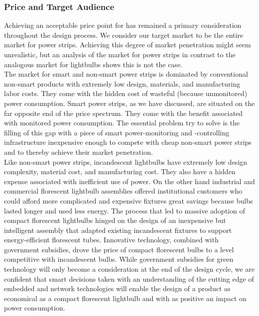 \subsubsection{Price and Target Audience}
Achieving an acceptable price point for \netlets has remained a primary consideration throughout the design process. We consider our target market to be the entire market for power strips. Achieving this degree of market penetration might seem unrealistic, but an analysis of the market for power strips in contrast to the analogous market for lightbulbs shows this is not the case.\\ 

The market for smart and non-smart power strips is dominated by conventional non-smart products with extremely low design, materials, and manufacturing labor costs. They come with the hidden cost of wasteful (because unmonitored) power consumption. Smart power strips, as we have discussed, are situated on the far opposite end of the price spectrum. They come with the benefit associated with monitored power consumption. The essential problem \netlets try to solve is the filling of this gap with a piece of smart power-monitoring and -controlling infrastructure inexpensive enough to compete with cheap non-smart power strips and to thereby achieve their market penetration.\\ 

Like non-smart power strips, incandescent lightbulbs have extremely low design complexity, material cost, and manufacturing cost. They also have a hidden expense associated with inefficient use of power. On the other hand industrial and commercial florescent lightbulb assemblies offered institutional customers who could afford more complicated and expensive fixtures great savings because bulbs lasted longer and used less energy. The process that led to massive adoption of compact florescent lightbulbs hinged on the design of an inexpensive but intelligent assembly that adapted existing incandescent fixtures to support energy-efficient florescent tubes. Innovative technology, combined with government subsidies, drove the price of compact florescent bulbs to a level competitive with incandescent bulbs. While government subsidies for green technology will only become a consideration at the end of the design cycle, we are confident that smart decisions taken with an understanding of the cutting edge of embedded and network technologies will enable the design of a product as economical as a compact florescent lightbulb and with as positive an impact on power consumption.
